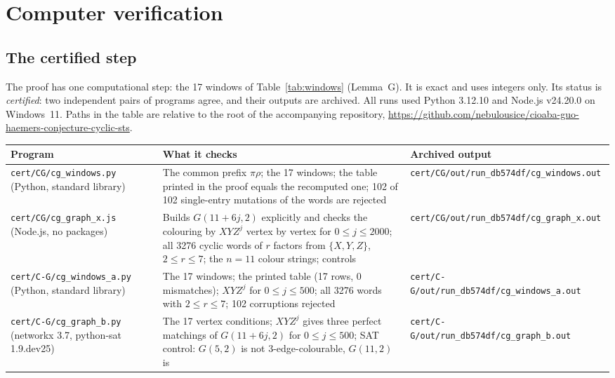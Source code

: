 \documentclass[11pt]{amsart}
\theoremstyle{plain}
\theoremstyle{definition}
\theoremstyle{remark}
\numberwithin{equation}{section}
\begin{document}
\section{Computer verification}\label{sec:computer}

\subsection{The certified step}
The proof has one computational step: the 17 windows of Table~\ref{tab:windows} (Lemma~G). It is exact and uses integers only. Its status is \emph{certified}: two independent pairs of programs agree, and their outputs are archived. All runs used Python 3.12.10 and Node.js v24.20.0 on Windows~11. Paths in the table are relative to the root of the accompanying repository, \url{https://github.com/nebulousice/cioaba-guo-haemers-conjecture-cyclic-sts}.

\begin{center}
\small
\begin{tabular}{>{\raggedright\arraybackslash}p{}>{\raggedright\arraybackslash}p{}>{\raggedright\arraybackslash}p{}}
\toprule
Program & What it checks & Archived output \\
\midrule
\nolinkurl{cert/CG/cg_windows.py} (Python, standard library) & The common prefix \(\pi\rho\); the 17 windows; the table printed in the proof equals the recomputed one; 102 of 102 single-entry mutations of the words are rejected & \nolinkurl{cert/CG/out/run_db574df/cg_windows.out} \\
\nolinkurl{cert/CG/cg_graph_x.js} (Node.js, no packages) & Builds \(G(11+6j,2)\) explicitly and checks the colouring by \(XYZ^j\) vertex by vertex for \(0\le j\le2000\); all 3276 cyclic words of \(r\) factors from \(\{X,Y,Z\}\), \(2\le r\le7\); the \(n=11\) colour strings; controls & \nolinkurl{cert/CG/out/run_db574df/cg_graph_x.out} \\
\nolinkurl{cert/C-G/cg_windows_a.py} (Python, standard library) & The 17 windows; the printed table (17 rows, 0 mismatches); \(XYZ^j\) for \(0\le j\le500\); all 3276 words with \(2\le r\le7\); 102 corruptions rejected & \nolinkurl{cert/C-G/out/run_db574df/cg_windows_a.out} \\
\nolinkurl{cert/C-G/cg_graph_b.py} (networkx 3.7, python-sat 1.9.dev25) & The 17 vertex conditions; \(XYZ^j\) gives three perfect matchings of \(G(11+6j,2)\) for \(0\le j\le500\); SAT control: \(G(5,2)\) is not \(3\)-edge-colourable, \(G(11,2)\) is & \nolinkurl{cert/C-G/out/run_db574df/cg_graph_b.out} \\
\bottomrule
\end{tabular}
\end{center}
\end{document}
